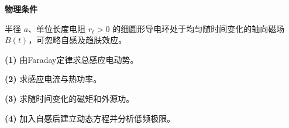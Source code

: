 \textbf{物理条件}\par 半径 \(a\)、单位长度电阻 \(r_\ell>0\) 的细圆形导电环处于均匀随时间变化的轴向磁场 \(B(t)\)，可忽略自感及趋肤效应。
\par\noindent\textbf{(1)} 由Faraday定律求总感应电动势。
\par\noindent\textbf{(2)} 求感应电流与热功率。
\par\noindent\textbf{(3)} 求随时间变化的磁矩和外源功。
\par\noindent\textbf{(4)} 加入自感后建立动态方程并分析低频极限。
